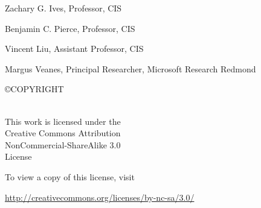 \documentclass[10pt]{report}
\begin{document}
\begin{titlepage}
\begin{flushleft}
Zachary G. Ives, Professor, CIS

Benjamin C. Pierce, Professor, CIS

Vincent Liu, Assistant Professor, CIS

Margus Veanes, Principal Researcher, Microsoft Research Redmond

\end{flushleft}

\end{titlepage}


\doublespacing

\thispagestyle{empty} %

\vspace*{\fill}

\begin{flushleft}
\mytitle

 \copyright \space COPYRIGHT

\myyear

\myauthorfull\\[24 pt] %

This work is licensed under the \\
Creative Commons Attribution \\
NonCommercial-ShareAlike 3.0 \\
License

To view a copy of this license, visit

\url{http://creativecommons.org/licenses/by-nc-sa/3.0/}

\end{flushleft}
\pagebreak
\end{document}
